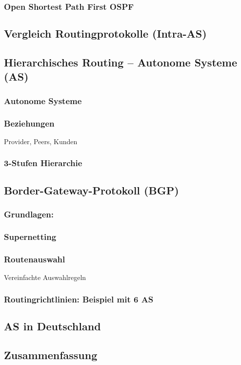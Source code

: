 \subsubsection{Open Shortest Path First OSPF}

\subsection{Vergleich Routingprotokolle (Intra-AS)}

\subsection{Hierarchisches Routing -- Autonome Systeme (AS)}
\subsubsection*{Autonome Systeme}

\subsubsection{Beziehungen}
Provider, Peers, Kunden
\subsubsection{3-Stufen Hierarchie}

\subsection{Border-Gateway-Protokoll (BGP)}
\subsubsection{Grundlagen:}
\subsubsection{Supernetting}
\subsubsection{Routenauswahl}
Vereinfachte Auswahlregeln
\subsubsection{Routingrichtlinien: Beispiel mit 6 AS}

\subsection{AS in Deutschland}

\subsection{Zusammenfassung}


